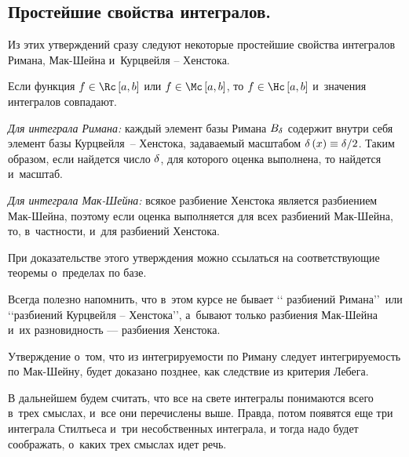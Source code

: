 \documentclass[draft]{article}
\begin{document}
\eject

\subsection{Простейшие свойства интегралов.}

Из этих утверждений сразу следуют некоторые простейшие свойства
интегралов Римана, Мак-Шейна и~Курцвейля -- Хенстока.

\bigskip


Если функция $f\isriman[a,b]$ или $f\ismacsh[a,b]$, то
$f\iskurzh[a,b]$ и~значения интегралов совпадают.

\pr

{\it Для интеграла Римана:} каждый элемент базы Римана $B_\delta$
 содержит внутри себя элемент базы Курцвейля~-- Хенстока, задаваемый масштабом
 $\dex\equiv{\de/2}$. Таким образом, если найдется число $\delta$, для которого оценка
выполнена, то найдется и~масштаб.

{\it Для интеграла Мак-Шейна:} всякое разбиение Хенстока является
разбиением Мак-Шейна, поэтому если оценка выполняется для всех
разбиений Мак-Шейна, то, в~частности, и~для разбиений Хенстока.

\prut

\bigskip

{\small\rems

\smallskip

При доказательстве этого утверждения можно ссылаться на
соответствующие теоремы о~пределах по базе.

\smallskip

Всегда полезно напомнить, что в~этом курсе не бывает \lq\lq
разбиений Римана\rq\rq\ или \lq\lq разбиений Курцвейля --
Хенстока\rq\rq, а~бывают только разбиения Мак-Шейна и~их
разновидность --- разбиения Хенстока.

\smallskip

Утверждение о~том, что из интегрируемости по Риману следует
интегрируемость по Мак-Шейну, будет доказано позднее, как следствие
из критерия Лебега.

\smallskip

В дальнейшем будем считать, что все на свете интегралы понимаются
всего в~трех смыслах, и~все они перечислены выше. Правда, потом
появятся еще три интеграла Стилтьеса и~три несобственных интеграла,
и тогда надо будет соображать, о~каких трех смыслах идет речь.}

\bigskip

\end{document}
